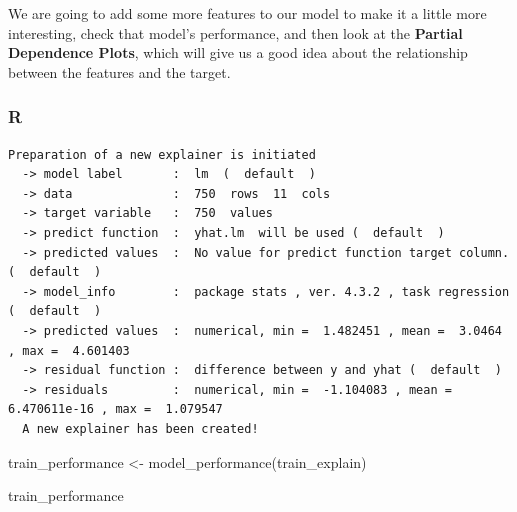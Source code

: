 \documentclass[
  letterpaper,
]{krantz}
\newenvironment{Shaded}{}{}
\newcommand{\AttributeTok}[1]{\textcolor[rgb]{0.49,0.56,0.16}{#1}}
\newcommand{\FunctionTok}[1]{\textcolor[rgb]{0.02,0.16,0.49}{#1}}
\newcommand{\NormalTok}[1]{#1}
\newcommand{\OtherTok}[1]{\textcolor[rgb]{0.00,0.44,0.13}{#1}}
\newcommand{\SpecialCharTok}[1]{\textcolor[rgb]{0.25,0.44,0.63}{#1}}
\newcommand{\StringTok}[1]{\textcolor[rgb]{0.25,0.44,0.63}{#1}}
\begin{document}
We are going to add some more features to our model to make it a little
more interesting, check that model's performance, and then look at the
\textbf{Partial Dependence Plots}, which will give us a good idea about
the relationship between the features and the target.

\subsubsection{R}

\begin{Shaded}
\end{Shaded}

\begin{verbatim}
Preparation of a new explainer is initiated
  -> model label       :  lm  (  default  )
  -> data              :  750  rows  11  cols 
  -> target variable   :  750  values 
  -> predict function  :  yhat.lm  will be used (  default  )
  -> predicted values  :  No value for predict function target column. (  default  )
  -> model_info        :  package stats , ver. 4.3.2 , task regression (  default  ) 
  -> predicted values  :  numerical, min =  1.482451 , mean =  3.0464 , max =  4.601403  
  -> residual function :  difference between y and yhat (  default  )
  -> residuals         :  numerical, min =  -1.104083 , mean =  6.470611e-16 , max =  1.079547  
  A new explainer has been created!  
\end{verbatim}

\begin{Shaded}
\begin{Highlighting}[]
\NormalTok{train\_performance }\OtherTok{\textless{}{-}} \FunctionTok{model\_performance}\NormalTok{(train\_explain)}

\NormalTok{train\_performance}
\end{Highlighting}
\end{Shaded}
\end{document}
